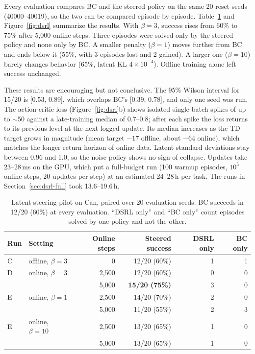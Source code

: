 Every evaluation compares BC and the steered policy on the same 20 reset
seeds (40000--40019), so the two can be compared episode by episode.
Table~\ref{tab:dsrl} and Figure~\ref{fig:dsrl} summarize the results. With
$\beta=3$, success rises from 60\% to 75\% after 5{,}000 online steps. Three
episodes were solved only by the steered policy and none only by BC. A
smaller penalty ($\beta=1$) moves further from BC and ends below it (55\%,
with 3 episodes lost and 2 gained). A larger one ($\beta=10$) barely changes
behavior (65\%, latent KL $4\times10^{-4}$). Offline training alone left
success unchanged.

These results are encouraging but not conclusive. The 95\% Wilson interval for
15/20 is [0.53, 0.89], which overlaps BC's [0.39, 0.78], and only one seed was
run. The action-critic loss (Figure~\ref{fig:dsrl}b) shows isolated
single-batch spikes of up to $\sim$50 against a late-training median of
0.7--0.8; after each spike the loss returns to its previous level at the next logged
update. Its median increases as the TD target grows in magnitude (mean target
$-17$ offline, about $-64$ online), which matches the longer return horizon
of online data. Latent standard deviations stay between 0.96 and 1.0, so the
noise policy shows no sign of collapse. Updates take 23--28\,ms on the GPU,
which put a full-budget run (100 warmup episodes, $10^5$ online steps, 20
updates per step) at an estimated 24--28\,h per task. The runs in
Section~\ref{sec:dsrl-full} took 13.6--19.6\,h.

\begin{table}[t]
  \centering
  \small
  \caption{Latent-steering pilot on Can, paired over 20 evaluation seeds. BC succeeds in 12/20 (60\%) at every evaluation.
  ``DSRL only'' and ``BC only'' count episodes solved by one policy and not the other.}
  \label{tab:dsrl}
  \begin{tabular}{llrrrr}
    \toprule
    Run & Setting & Online steps & Steered success & DSRL only & BC only \\
    \midrule
    C & offline, $\beta=3$   & 0     & 12/20 (60\%) & 1 & 1 \\
    D & online, $\beta=3$    & 2{,}500 & 12/20 (60\%) & 0 & 0 \\
      &                      & 5{,}000 & \textbf{15/20 (75\%)} & 3 & 0 \\
    E & online, $\beta=1$    & 2{,}500 & 14/20 (70\%) & 2 & 0 \\
      &                      & 5{,}000 & 11/20 (55\%) & 2 & 3 \\
    E & online, $\beta=10$   & 2{,}500 & 13/20 (65\%) & 1 & 0 \\
      &                      & 5{,}000 & 13/20 (65\%) & 1 & 0 \\
    \bottomrule
  \end{tabular}
\end{table}

